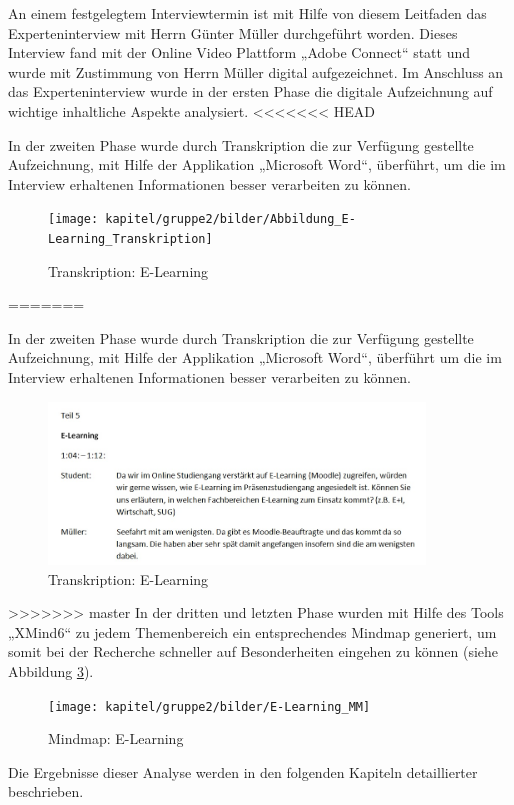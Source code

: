 An einem festgelegtem Interviewtermin ist mit Hilfe von diesem Leitfaden das Experteninterview mit Herrn Günter Müller durchgeführt worden. Dieses Interview fand mit der Online Video Plattform „Adobe Connect“ statt und wurde mit Zustimmung von Herrn Müller digital aufgezeichnet. Im Anschluss an das Experteninterview wurde in der ersten Phase die digitale Aufzeichnung auf wichtige inhaltliche Aspekte analysiert. 
<<<<<<< HEAD

In der zweiten Phase wurde durch Transkription die zur Verfügung gestellte Aufzeichnung, mit Hilfe der Applikation „Microsoft Word“, überführt, um die im Interview erhaltenen Informationen besser verarbeiten zu können.

\begin{figure}[h!]
	\centering
	\texttt{[image: kapitel/gruppe2/bilder/Abbildung\_E-Learning\_Transkription]}
	\caption{Transkription: E-Learning}
	\label{fig_E-Learning_Transkription}
\end{figure}

=======

In der zweiten Phase wurde durch Transkription die zur Verfügung gestellte Aufzeichnung, mit Hilfe der Applikation „Microsoft Word“, überführt um die im Interview erhaltenen Informationen besser verarbeiten zu können.

\begin{figure}[h!]
	\centering
	\includegraphics[width=10cm]{kapitel/gruppe2/bilder/E-Learning_Transkription}
	\caption{Transkription: E-Learning}
	\label{fig_E-Learning_Transkription}
\end{figure}

>>>>>>> master
In der dritten und letzten Phase wurden mit Hilfe des Tools „XMind6“ zu jedem Themenbereich ein entsprechendes Mindmap generiert, um somit bei der Recherche schneller auf Besonderheiten eingehen zu können  (siehe Abbildung \ref{fig_E-Learning_MM}).

\begin{figure}[h!]
	\centering
	\texttt{[image: kapitel/gruppe2/bilder/E-Learning\_MM]}
	\caption{Mindmap: E-Learning}
	\label{fig_E-Learning_MM}
\end{figure}

Die Ergebnisse dieser Analyse werden in den folgenden Kapiteln detaillierter beschrieben. 
